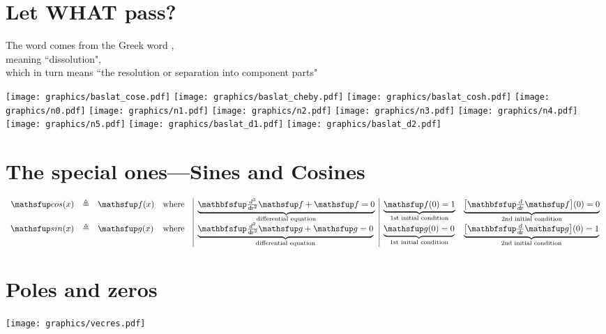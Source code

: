 \section*{Let WHAT pass?}

The word  comes from the Greek word
{},
\\
meaning ``dissolution",
\\[1em]
which in turn means
``the resolution or separation into component parts"




\newpage
\texttt{[image: graphics/baslat\_cose.pdf]}  \newpage
\texttt{[image: graphics/baslat\_cheby.pdf]} \newpage
\texttt{[image: graphics/baslat\_cosh.pdf]}  \newpage
\texttt{[image: graphics/n0.pdf]}
\texttt{[image: graphics/n1.pdf]}
\texttt{[image: graphics/n2.pdf]}
\texttt{[image: graphics/n3.pdf]}
\texttt{[image: graphics/n4.pdf]}
\texttt{[image: graphics/n5.pdf]}\newpage
\texttt{[image: graphics/baslat\_d1.pdf]}    \newpage
\texttt{[image: graphics/baslat\_d2.pdf]}    \newpage


\section*{The special ones---Sines and Cosines}
      \[\begin{array}{rcl @{\quad}c@{\quad} |l|ll}
        \cos(x) &\eqd& \ff(x)
          & \text{where} 
          & \mcom{\brn{\opDiff\ff}+ \ff=0}{differential equation}  
          & \mcom{\ff(0)=1           }{1st initial condition}
          & \mcom{\brs{\opDif\ff}(0)=0 }{2nd initial condition}
        \\
        \sin(x) &\eqd& \fg(x)
          & \text{where} 
          & \mcom{\brn{\opDiff\fg}+ \fg=0}{differential equation}  
          & \mcom{\fg(0)=0           }{1st initial condition}
          & \mcom{\brs{\opDif\fg}(0)=1 }{2nd initial condition}
      \end{array}\]



\section*{Poles and zeros}

  \texttt{[image: graphics/vecres.pdf]}


